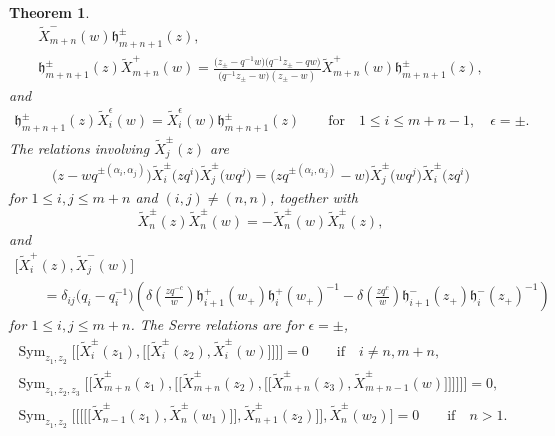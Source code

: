 \documentclass[10pt,a4paper]{amsart}
\numberwithin{equation}{section}
\newtheorem{Theorem}{Theorem}[section]
\begin{document}
\begin{Theorem}
\begin{gather*}
\widetilde{X}_{m+n}^-(w)\mathfrak{h}_{m+n+1}^{\pm}(z),\\
 \mathfrak{h}_{m+n+1}^{\pm}(z)\widetilde{X}_{m+n}^+(w)=\frac{\bigl(z_{\pm}-q^{-1}w\bigr)\bigl(q^{-1}z_{\pm}-qw\bigr)}
 {\bigl(q^{-1}z_{\pm}-w\bigr)(z_{\pm}-w)}\widetilde{X}_{m+n}^+(w)\mathfrak{h}_{m+n+1}^{\pm}(z),
\end{gather*}
and
\begin{gather*}%
\mathfrak{h}_{m+n+1}^{\pm}(z)\widetilde{X}_i^{\epsilon}(w)=\widetilde{X}_i^{\epsilon}(w)\mathfrak{h}_{m+n+1}^{\pm}(z)\qquad
 \text{for} \quad 1\leq i\leq m+n-1,\quad \epsilon=\pm .
\end{gather*}
The relations involving $\widetilde{X}_j^{\pm}(z)$ are
\begin{gather*}%
 \bigl(z-wq^{\pm (\alpha_i, \alpha_j)}\bigr)\widetilde{X}_i^{\pm}\bigl(zq^i\bigr)\widetilde{X}_j^{\pm}\bigl(wq^j\bigr)=\bigl(zq^{\pm (\alpha_i, \alpha_j)}-w\bigr)\widetilde{X}_j^{\pm}\bigl(wq^j\bigr)\widetilde{X}_i^{\pm}\bigl(zq^i\bigr)
\end{gather*}
for $1\leq i,j \leq m+n$ and $(i,j)\neq(n,n)$, together with
 \[%
 \widetilde{X}_{n}^{\pm}(z)\widetilde{X}_n^{\pm}(w)=-\widetilde{X}_n^{\pm}(w)\widetilde{X}_n^{\pm}(z),
\]
and
\begin{gather*}%
 \bigl[\widetilde{X}_i^{+}(z), \widetilde{X}_j^{-}(w)\bigr]\\
 \qquad=\delta_{ij}\bigl(q_i-q_i^{-1}\bigr)\left(\delta\left(\frac{zq^{-c}}{w}\right)\mathfrak{h}_{i+1}^+(w_+)
 \mathfrak{h}_i^+(w_+)^{-1}-\delta\left(\frac{zq^{c}}{w}\right)\mathfrak{h}_{i+1}^-(z_+)\mathfrak{h}_i^-(z_+)^{-1}\right)
\end{gather*}
for $1\leq i,j\leq m+n$.
The Serre relations are for $\epsilon=\pm$,
\begin{gather*}%
\operatorname{Sym}_{z_1,z_2}\bigl[\!\!\bigl[\widetilde{X}_i^{\pm}(z_1),\bigl[\!\!\bigl[\widetilde{X}_i^{\pm}(z_2), \widetilde{X}_i^{\pm}(w)\bigr]\!\!\bigr] \bigr]\!\!\bigr]=0\qquad\textrm{if}\quad i\neq n,m+n, \\
\operatorname{Sym}_{z_1,z_2,z_3}\bigl[\!\!\bigl[\widetilde{X}_{m+n}^{\pm}(z_1), \bigl[\!\!\bigl[\widetilde{X}_{m+n}^{\pm}(z_2),\bigl[\!\!\bigl[\widetilde{X}_{m+n}^{\pm}(z_3), \widetilde{X}_{m+n-1}^{\pm}(w)\bigr]\!\!\bigr] \bigr]\!\!\bigr] \bigr]\!\!\bigr]=0, \\
\operatorname{Sym}_{z_1,z_2}\bigl[ \bigl[\!\!\bigl[ \bigl[\!\!\bigl[\widetilde{X}_{n-1}^{\pm}(z_1), \widetilde{X}_{n}^{\pm}(w_1)\bigr]\!\!\bigr], \widetilde{X}_{n+1}^{\pm}(z_2)\bigr]\!\!\bigr], \widetilde{X}_{n}^{\pm}(w_2)\bigr]=0
\qquad\textrm{if}\quad n>1.
\end{gather*}


\end{Theorem}
\end{document}
